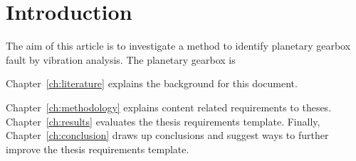 \chapter{Introduction}\label{ch:introduction}

The aim of this article is to investigate a method to identify planetary gearbox fault by vibration analysis. The planetary gearbox is 

Chapter~\ref{ch:literature} explains the background for this document.

Chapter~\ref{ch:methodology} explains content related requirements to theses.
Chapter~\ref{ch:results} evaluates the thesis requirements template.  Finally,
Chapter~\ref{ch:conclusion} draws up conclusions and suggest ways to
further improve the thesis requirements template.

